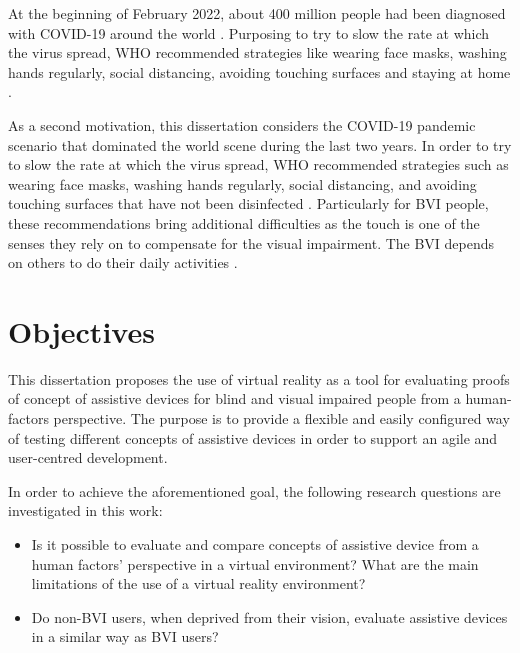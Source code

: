 At the beginning of February 2022, about 400 million people had been diagnosed with COVID-19 around the world \cite{ourworldindata_cases}. Purposing to try to slow the rate at which the virus spread, WHO recommended strategies like wearing face masks, washing hands regularly, social distancing, avoiding touching surfaces and staying at home .

As a second motivation, this dissertation considers the COVID-19 pandemic scenario that dominated the world scene during the last two years. In order to try to slow the rate at which the virus spread, WHO recommended strategies such as wearing face masks, washing hands regularly, social distancing, and avoiding touching surfaces that have not been disinfected \cite{who_2020}. Particularly for BVI people, these recommendations bring additional difficulties as the touch is one of the senses they rely on to compensate for the visual impairment. %
The BVI depends on others to do their daily activities \cite{jondani2021strategies}.

\section{Objectives}
\label{sec:objetivos}


 This dissertation proposes the use of virtual reality as a tool for evaluating proofs of concept of assistive devices for blind and visual impaired people from a human-factors perspective. The purpose is to provide a flexible and easily configured way of testing different concepts of assistive devices in order to support an agile and user-centred development. 

 
 In order to achieve the aforementioned goal, the following research questions are investigated in this work:

 \begin{itemize}
     \item Is it possible to evaluate and compare concepts of assistive device from a human factors’ perspective in a virtual environment? What are the main limitations of the use of a virtual reality environment? \label{itm:obj_first}
     \item Do non-BVI users, when deprived from their vision, evaluate assistive devices in a similar way as BVI users? \label{itm:obj_second}
 \end{itemize}
 

